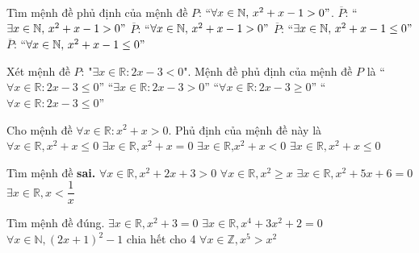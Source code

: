 \begin{ex}
	Tìm mệnh đề phủ định của mệnh đề $P$: “$\forall x\in \mathbb{N},\,x^2+x-1>0"$.
	\choice
	{$\overline{P}$: “$\exists x\in \mathbb{N},\,x^2+x-1>0"$}
	{$\overline{P}$: “$\forall x\in \mathbb{N},\,x^2+x-1>0"$}
	{\True $\overline{P}$: “$\exists x\in \mathbb{N},\,x^2+x-1\le 0"$}
	{$\overline{P}$: “$\forall x\in \mathbb{N},\,x^2+x-1\le 0"$}
	\loigiai{
	}
\end{ex}

\begin{ex}
	Xét mệnh đề $P$: "$\exists x\in \mathbb{R}:2x-3<0$". Mệnh đề phủ định của mệnh đề $P$ là
	\choice
	{“$\forall x\in \mathbb{R}:2x-3\le 0$”}
	{“$\exists x\in \mathbb{R}:2x-3>0$”}
	{\True “$\forall x\in \mathbb{R}:2x-3\ge 0$”}
	{“$\forall x\in \mathbb{R}:2x-3\le 0$”}
	\loigiai{
	}
\end{ex}

\begin{ex}
	Cho mệnh đề $\forall x\in \mathbb{R}:x^2+x>0$. Phủ định của mệnh đề này là
	\choice
	{$\forall x\in \mathbb{R},\text{}x^2+x\le 0$}
	{$\exists x\in \mathbb{R},\text{}{x^2}+x=0$}
	{$\exists x\in \mathbb{R}\text{,}x^2+x<0$}
	{\True $\exists x\in \mathbb{R},\text{}{x^2}+x\le 0$}
	\loigiai{
	}
\end{ex}

\begin{ex}
	Tìm mệnh đề \textbf{sai.}
	\choice
	{$\forall x\in \mathbb{R},\text{}x^2+2x+3>0$}
	{\True $\forall x\in \mathbb{R},\text{}{x^2}\ge x$}
	{$\exists x\in \mathbb{R},\text{}x^2+5x+6=0$}
	{$\exists x\in \mathbb{R},\text{}x<\dfrac{1}{x}$}
\end{ex}

\begin{ex}
	Tìm mệnh đề đúng.
	\choice
	{$\exists x\in \mathbb{R},\text{}x^2+3=0$}
	{$\exists x\in \mathbb{R},\text{}{x^4}+3x^2+2=0$}
	{\True $\forall x\in \mathbb{N},\text{}{\left(2x+1\right)^2}-1$ chia hết cho 4}
	{$\forall x\in \mathbb{Z},\text{}x^5>x^2$}
\end{ex}

